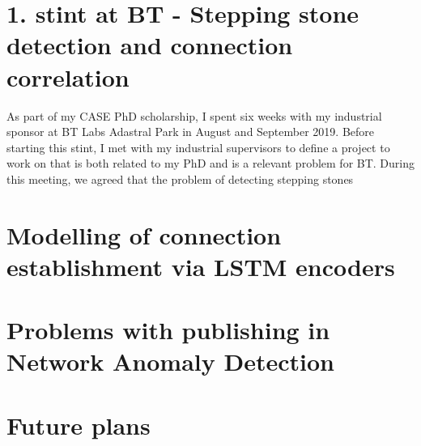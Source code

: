 \documentclass[a4paper,12pt,twoside]{report}
\begin{document}
\section{1. stint at BT - Stepping stone detection and connection correlation}

As part of my CASE PhD scholarship, I spent six weeks with my industrial sponsor at BT Labs Adastral Park in August and September 2019. Before starting this stint, I met with my industrial supervisors to define a project to work on that is both related to my PhD and is a relevant problem for BT. During this meeting, we agreed that the problem of detecting stepping stones



\section{Modelling of connection establishment via LSTM encoders}

\section{Problems with publishing in Network Anomaly Detection}

\section{Future plans}










\end{document}

